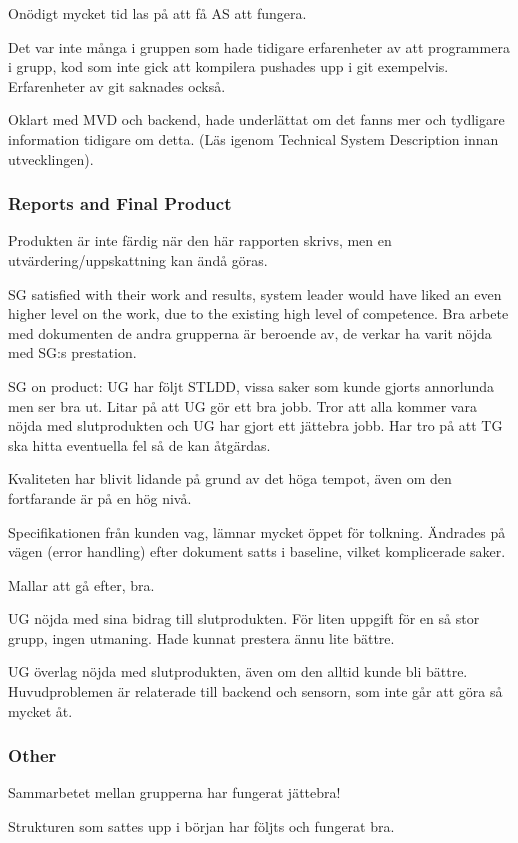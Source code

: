 \documentclass[a4paper]{article}
\begin{document}
Onödigt mycket tid las på att få AS att fungera.

Det var inte många i gruppen som hade tidigare erfarenheter av att programmera i grupp, kod som inte gick att kompilera pushades upp i git exempelvis. Erfarenheter av git saknades också.

Oklart med MVD och backend, hade underlättat om det fanns mer och tydligare information tidigare om detta. (Läs igenom Technical System Description innan utvecklingen).


\subsubsection{Reports and Final Product}
Produkten är inte färdig när den här rapporten skrivs, men en utvärdering/uppskattning kan ändå göras.

SG satisfied with their work and results, system leader would have liked an even higher level on the work, due to the existing high level of competence. Bra arbete med dokumenten de andra grupperna är beroende av, de verkar ha varit nöjda med SG:s prestation.

SG on product: UG har följt STLDD, vissa saker som kunde gjorts annorlunda men ser bra ut. Litar på att UG gör ett bra jobb. Tror att alla kommer vara nöjda med slutprodukten och UG har gjort ett jättebra jobb. Har tro på att TG ska hitta eventuella fel så de kan åtgärdas. 

Kvaliteten har blivit lidande på grund av det höga tempot, även om den fortfarande är på en hög nivå.

Specifikationen från kunden vag, lämnar mycket öppet för tolkning. Ändrades på vägen (error handling) efter dokument satts i baseline, vilket komplicerade saker.

Mallar att gå efter, bra.

UG nöjda med sina bidrag till slutprodukten. För liten uppgift för en så stor grupp, ingen utmaning. Hade kunnat prestera ännu lite bättre.

UG överlag nöjda med slutprodukten, även om den alltid kunde bli bättre. Huvudproblemen är relaterade till backend och sensorn, som inte går att göra så mycket åt.

\subsubsection{Other}
Sammarbetet mellan grupperna har fungerat jättebra!

Strukturen som sattes upp i början har följts och fungerat bra.
\end{document}
